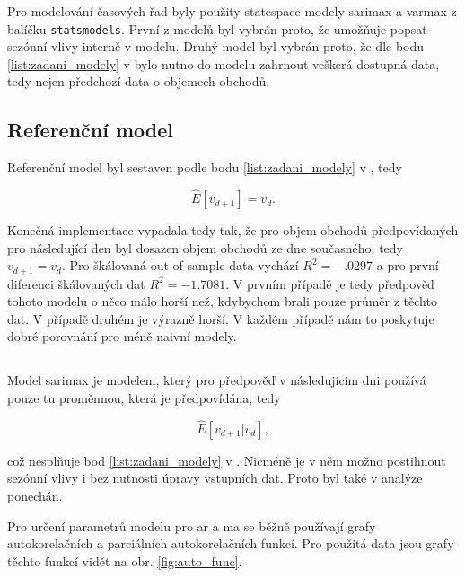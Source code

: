 \documentclass[a4paper,12pt, czech]{article}
\newcommand{\code}[1]{\texttt{#1}}
\begin{document}
Pro modelování časových řad byly použity statespace modely  \gls{sarimax} a \gls{varmax} z balíčku \code{statsmodels}.
První z modelů byl vybrán proto, že umožňuje popsat sezónní vlivy interně v modelu.
Druhý model byl vybrán proto, že dle bodu \ref{list:zadani_modely} v  bylo nutno do modelu zahrnout veškerá dostupná data, tedy nejen předchozí data o objemech obchodů.

\subsection{Referenční model}

Referenční model byl sestaven podle bodu \ref{list:zadani_modely} v , tedy

\begin{equation}\label{eq:reference}
\hat{E}\left[v_{d+1}\right] = v_d.
\end{equation}

Konečná implementace vypadala tedy tak, že pro objem obchodů předpovídaných pro následující den byl dosazen objem obchodů ze dne současného, tedy $v_{d+1} = v_d$.
Pro škálovaná out of sample data vychází $R^2=\num{-.0297}$ a pro první diferenci škálovaných dat $R^2=\num{-1.7081}$.
V prvním případě je tedy předpověď tohoto modelu o něco málo horší než, kdybychom brali pouze průměr z těchto dat.
V případě druhém je výrazně horší.
V každém případě nám to poskytuje dobré porovnání pro méně naivní modely.

\subsection{} \label{sec:sarimax}

Model \gls{sarimax} je modelem, který pro předpověď v následujícím dni používá pouze tu proměnnou, která je předpovídána, tedy 

\begin{equation}\label{eq:sarimax}
\hat{E}\left[v_{d+1}|v_d\right],
\end{equation}

což nesplňuje bod \ref{list:zadani_modely} v .
Nicméně je v něm možno postihnout sezónní vlivy i bez nutnosti úpravy vstupních dat.
Proto byl také v analýze ponechán.

Pro určení parametrů modelu pro \gls{ar} a \gls{ma} se běžně používají grafy autokorelačních a parciálních autokorelačních funkcí.
Pro použitá data jsou grafy těchto funkcí vidět na obr. \ref{fig:auto_func}.
\end{document}
